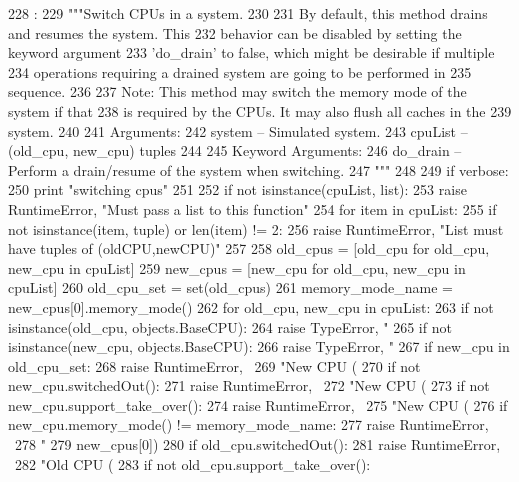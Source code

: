 \begin{DoxyCode}
228                                                             :
229     """Switch CPUs in a system.
230 
231     By default, this method drains and resumes the system. This
232     behavior can be disabled by setting the keyword argument
233     'do_drain' to false, which might be desirable if multiple
234     operations requiring a drained system are going to be performed in
235     sequence.
236 
237     Note: This method may switch the memory mode of the system if that
238     is required by the CPUs. It may also flush all caches in the
239     system.
240 
241     Arguments:
242       system -- Simulated system.
243       cpuList -- (old_cpu, new_cpu) tuples
244 
245     Keyword Arguments:
246       do_drain -- Perform a drain/resume of the system when switching.
247     """
248 
249     if verbose:
250         print "switching cpus"
251 
252     if not isinstance(cpuList, list):
253         raise RuntimeError, "Must pass a list to this function"
254     for item in cpuList:
255         if not isinstance(item, tuple) or len(item) != 2:
256             raise RuntimeError, "List must have tuples of (oldCPU,newCPU)"
257 
258     old_cpus = [old_cpu for old_cpu, new_cpu in cpuList]
259     new_cpus = [new_cpu for old_cpu, new_cpu in cpuList]
260     old_cpu_set = set(old_cpus)
261     memory_mode_name = new_cpus[0].memory_mode()
262     for old_cpu, new_cpu in cpuList:
263         if not isinstance(old_cpu, objects.BaseCPU):
264             raise TypeError, "%
265         if not isinstance(new_cpu, objects.BaseCPU):
266             raise TypeError, "%
267         if new_cpu in old_cpu_set:
268             raise RuntimeError, \
269                 "New CPU (%
270         if not new_cpu.switchedOut():
271             raise RuntimeError, \
272                 "New CPU (%
273         if not new_cpu.support_take_over():
274             raise RuntimeError, \
275                 "New CPU (%
276         if new_cpu.memory_mode() != memory_mode_name:
277             raise RuntimeError, \
278                 "%
279                                                                new_cpus[0])
280         if old_cpu.switchedOut():
281             raise RuntimeError, \
282                 "Old CPU (%
283         if not old_cpu.support_take_over():

\end{DoxyCode}
